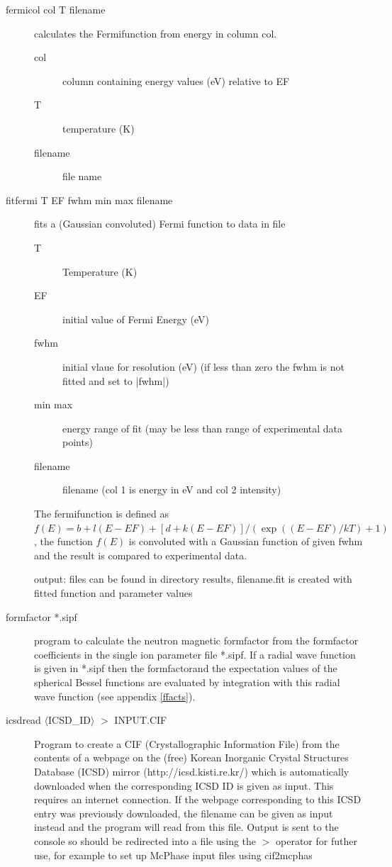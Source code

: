 \begin{description}
\item [\prg fermicol col T filename] calculates the Fermifunction from energy in column col.
\begin{description}
\item[col] column containing energy values (eV) relative to EF
 \item[T] temperature (K)
 \item[filename] file name
\end{description}
\item[\prg fitfermi T EF fwhm min max filename] 
fits a (Gaussian convoluted) Fermi function to data in file
\begin{description}
\item[T] Temperature (K)
\item[EF] initial value of Fermi Energy (eV)
\item[fwhm] initial vlaue for resolution (eV) (if less than zero the fwhm is not fitted and set to |fwhm|)
\item[min max] energy range of fit (may be less than range of experimental data points)
\item[filename] filename (col 1 is energy in eV and col 2 intensity)
\end{description}
The fermifunction is defined as
      $ f(E)=b+l(E-EF)+[d+k(E-EF)]/(\exp((E-EF)/kT)+1)$, the function
      $ f(E)$ is convoluted with a Gaussian function of given fwhm
            and the  result is compared to experimental data.

 output:  files can be found in directory results, filename.fit is created with fitted function and parameter values
\item[\prg formfactor *.sipf] program to calculate the neutron magnetic formfactor
from the formfactor coefficients in the single ion parameter file *.sipf. If a radial wave function is given in *.sipf
then the formfactorand the expectation values of the spherical Bessel functions  are evaluated by integration
with this radial wave function (see appendix \ref{ffacts}).

\item[\prg icsdread $\langle$ICSD\_ID$\rangle$ $>$ INPUT.CIF] 
Program to create a CIF (Crystallographic Information File) from the contents of a webpage on the (free)
Korean Inorganic Crystal Structures Database (ICSD) mirror (http://icsd.kisti.re.kr/) which is automatically 
downloaded when the corresponding ICSD ID is given as input. This requires an internet connection. If the 
webpage corresponding to this ICSD entry was previously downloaded, the filename can be given as input instead
and the program will read from this file. Output is sent to the console so should be redirected into a file
using the {\prg $>$} operator for futher use, for example to set up McPhase input files using {\prg cif2mcphas}


\end{description}
